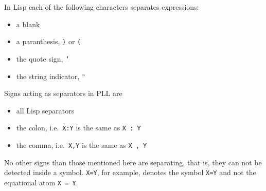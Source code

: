 In Lisp each of the following characters separates expressions: 

\begin{itemize}
\item a blank
\item a  paranthesis,  {\tt )} or {\tt (}
\item the quote sign, {\tt '}
\item the string indicator, {\tt "}
\end{itemize}

Signs acting as separators in PLL are 

\begin{itemize}
\item all Lisp separators 
\item the colon, i.e.\ {\tt  X:Y} is the same as {\tt X : Y}
\item the comma, i.e.\ {\tt X,Y} is the same as {\tt X , Y}
\end{itemize}

No other signs than those mentioned here are separating, that is,
they can not be detected inside a symbol. {\tt X=Y}, for example, denotes
the symbol {\tt X=Y} and not the equational atom {\tt X = Y}.
